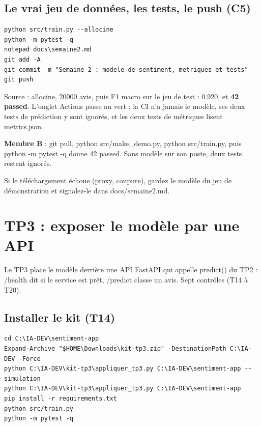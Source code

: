 \documentclass[11pt,a4paper]{article}
\newcommand{\co}[1]{{\ttfamily\hyphenchar\font=45\relax #1}}
\begin{document}
\subsection{Le vrai jeu de données, les tests, le push (C5)}

\begin{lstlisting}
python src/train.py --allocine
python -m pytest -q
notepad docs\semaine2.md
git add -A
git commit -m "Semaine 2 : modele de sentiment, metriques et tests"
git push
\end{lstlisting}

\begin{attendu}
\co{Source : allocine, 20000 avis}, puis \co{F1 macro sur le jeu de test : 0.920}, et \textbf{42 passed}.
L'onglet Actions passe au vert : la CI n'a jamais le modèle, ses deux tests de prédiction y sont ignorés, et
les deux tests de métriques lisent \co{metrics.json}.
\end{attendu}

\textbf{Membre B} : \co{git pull}, \co{python src/make\_demo.py}, \co{python src/train.py}, puis
\co{python -m pytest -q} donne 42 passed. Sans modèle sur son poste, deux tests restent ignorés.

\begin{attention}
Si le téléchargement échoue (proxy, coupure), gardez le modèle du jeu de démonstration et signalez-le dans
\co{docs/semaine2.md}.
\end{attention}

\section{TP3 : exposer le modèle par une API}

Le TP3 place le modèle derrière une API FastAPI qui appelle \co{predict()} du TP2 : \co{/health} dit si le
service est prêt, \co{/predict} classe un avis. Sept contrôles (T14 à T20).

\subsection{Installer le kit (T14)}

\begin{lstlisting}
cd C:\IA-DEV\sentiment-app
Expand-Archive "$HOME\Downloads\kit-tp3.zip" -DestinationPath C:\IA-DEV -Force
python C:\IA-DEV\kit-tp3\appliquer_tp3.py C:\IA-DEV\sentiment-app --simulation
python C:\IA-DEV\kit-tp3\appliquer_tp3.py C:\IA-DEV\sentiment-app
pip install -r requirements.txt
python src/train.py
python -m pytest -q
\end{lstlisting}
\end{document}
